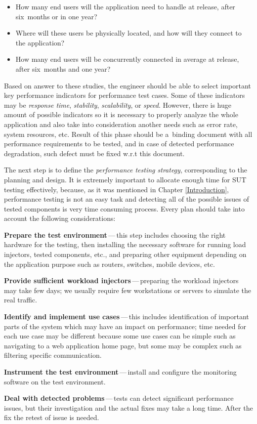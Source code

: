 \begin{itemize}
	\setlength\itemsep{0em}
	\item How many end users will the application need to handle at release, after six~months or in one year?
	\item Where will these users be physically located, and how will they connect to the application?
	\item How many end users will be concurrently connected in average at release, after six~months and one year?
\end{itemize}

Based on answer to these studies, the engineer should be able to select important key performance indicators for performance test cases. Some of these indicators may be \emph{response time}, \emph{stability}, \emph{scalability}, or \emph{speed}. However, there is huge amount of possible indicators so it is necessary to properly analyze the whole application and also take into consideration another needs such as error rate, system resources, etc.  Result of this phase should be a~binding document with all performance requirements to be tested, and in case of detected performance degradation, such defect must be fixed w.r.t this document.

The next step is to define the \emph{performance testing strategy}, corresponding to the planning and design. It is extremely important to allocate enough time for SUT testing effectively, because, as it was mentioned in Chapter \ref{Introduction}, performance testing is not an easy task and detecting all of the possible issues of tested components is very time consuming process. Every plan should take into account the following considerations:

\begin{description}
	\setlength\itemsep{0em}
	\item \textbf{Prepare the test environment}\,---\,this step includes choosing the right hardware for the testing, then installing the necessary software for running load injectors, tested components, etc., and preparing other equipment depending on the application purpose such as routers, switches, mobile devices, etc.
	\item \textbf{Provide sufficient workload injectors}\,---\,preparing the workload injectors may take few days; we usually require few workstations or servers to simulate the real traffic.
	\item \textbf{Identify and implement use cases}\,---\,this includes identification of important parts of the system which may have an impact on performance; time needed for each use case may be different because some use cases can be simple such as navigating to a web application home page, but some may be complex such as filtering specific communication.
	\item \textbf{Instrument the test environment}\,---\,install and configure the monitoring software on the test environment.
	\item \textbf{Deal with detected problems}\,---\,tests can detect significant performance issues, but their investigation and the actual fixes may take a long time. After the fix the retest of issue is needed.
\end{description}

